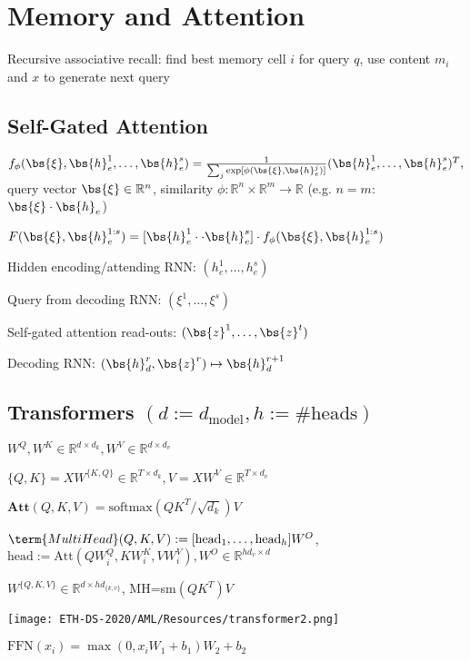 \section{Memory and Attention}
Recursive associative recall: find best memory cell $i$ for query $q$, use content $m_i$ and $x$ to generate next query 
\subsection*{Self-Gated Attention}
$f_{\phi}(\bs{\xi},\bs{h}^1_e,\dots,\bs{h}^s_e)=\frac{1}{\sum_j \exp [\phi(\bs{\xi},\bs{h}^j_e)] }(\bs{h}^1_e,\dots,\bs{h}^s_e)^T,$ query vector $\bs{\xi}\in\mathbb{R}^n$, similarity $\phi:\mathbb{R}^n\times\mathbb{R}^m\rightarrow\mathbb{R}$ (e.g. $n=m$: $\bs{\xi}\cdot \bs{h}_e$)

 $F(\bs{\xi},\bs{h}^{1:s}_e)=[\bs{h}^1_e\cdot\cdot\bs{h}^s_e]\cdot f_{\phi}(\bs{\xi},\bs{h}^{1:s}_e)$

Hidden encoding/attending RNN: $(h_e^1,\dots,h^s_e)$

Query from decoding RNN: $(\xi^1,\dots,\xi^s)$

Self-gated attention read-outs: $(\bs{z}^1,\dots,\bs{z}^t)$

Decoding RNN: $(\bs{h}^r_d,\bs{z}^r)\mapsto \bs{h}^{r+1}_d$

\subsection*{Transformers $(d:=d_{\text{model}},h:=\#\text{heads})$}

$W^Q,W^K\in \mathbb{R}^{d\times d_k},W^V\in \mathbb{R}^{d \times d_v}$

$\{Q,K\}=XW^{\{K,Q\}}\in \mathbb{R}^{T\times d_k},V=XW^V\in \mathbb{R}^{T\times d_v}$ 

$\textbf{Att}(Q,K,V)=\text{softmax}(QK^T/\sqrt{d_k})V$

$\term{MultiHead}(Q,K,V):=[\text{head}_1,\dots,\text{head}_h]W^O$,
$\text{head}:=\text{Att}(QW^Q_i,KW^K_i,VW^V_i),W^O\in \mathbb{R}^{hd_v\times d}$

 $W^{\{Q,K,V\}}\in\mathbb{R}^{d\times h d_{\{k,v\}}}$, MH=sm$(QK^T)V$

\texttt{[image: ETH-DS-2020/AML/Resources/transformer2.png]}

$\text{FFN}(x_i)=\max(0,x_i W_1+b_1)W_2+b_2$










